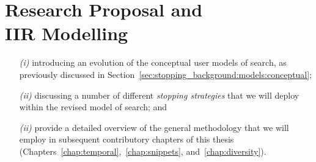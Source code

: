 
\chapter[Models and Proposal]{Research Proposal and\\IIR Modelling}\label{chap:proposal}


%
%
%
%
%
%
%
%
%
%
%
%
%


\begin{itemize}
    \item[\emph{(i)}]{introducing an evolution of the conceptual user models of search, as previously discussed in Section~\ref{sec:stopping_background:models:conceptual};}
    \item[\emph{(ii)}]{discussing a number of different \emph{stopping strategies} that we will deploy within the revised model of search; and}
    \item[\emph{(ii)}]{provide a detailed overview of the general methodology that we will employ in subsequent contributory chapters of this thesis (Chapters~\ref{chap:temporal},~\ref{chap:snippets}, and~\ref{chap:diversity}).}
\end{itemize}


